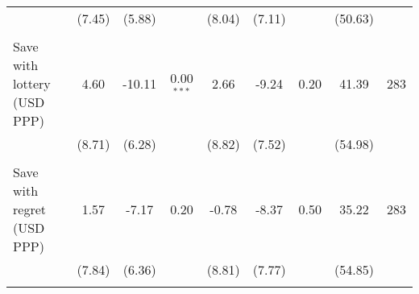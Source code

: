 \begin{table}[h]
{\begin{threeparttable}
\begin{tabular}{l*{8}{c}}
          &   (7.45)&   (5.88)&         &   (8.04)&   (7.11)&         &  (50.63)&         \\
          &         &         &         &         &         &         &         &         \\
Save with lottery (USD PPP)&     4.60&   -10.11&0.00$^{***}$&     2.66&    -9.24&     0.20&    41.39&      283\\
          &   (8.71)&   (6.28)&         &   (8.82)&   (7.52)&         &  (54.98)&         \\
          &         &         &         &         &         &         &         &         \\
Save with regret (USD PPP)&     1.57&    -7.17&     0.20&    -0.78&    -8.37&     0.50&    35.22&      283\\
          &   (7.84)&   (6.36)&         &   (8.81)&   (7.77)&         &  (54.85)&         \\
          &         &         &         &         &         &         &         &         \\
\bottomrule \end{tabular} \begin{tablenotes}[flushleft] \footnotesize \item  \end{tablenotes} \end{threeparttable} } \end{table}

